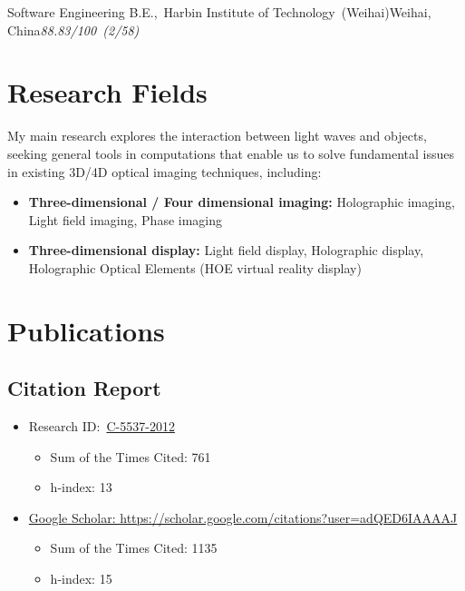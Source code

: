 \documentclass[10pt,a4paper]{moderncv}
\begin{document}
{Software Engineering}
{B.E.,~Harbin Institute of Technology~(Weihai)}{Weihai, China}{\textit{88.83/100~(2/58)}}{}

\section{Research Fields}
My main research explores the interaction between light waves and objects, seeking general tools in computations that enable us to solve fundamental issues in existing 3D/4D optical imaging techniques, including:
\begin{itemize}
	\item \textbf{Three-dimensional / Four dimensional imaging:} Holographic imaging, Light field imaging, Phase imaging
	\item \textbf{Three-dimensional display:} Light field display, Holographic display, Holographic Optical Elements (HOE virtual reality display)
\end{itemize}

\section{Publications}

\subsection{Citation Report}

\begin{itemize}
	\item Research ID:~\href{http://www.researcherid.com/rid/C-5537-2012}{C-5537-2012}
	\begin{itemize}
		\item Sum of the Times Cited: 761
		\item h-index: 13
	\end{itemize}
	
	\vspace{3pt}
	\item \href{https://scholar.google.com/citations?user=adQED6IAAAAJ&sortby=pubdate}{Google Scholar: https://scholar.google.com/citations?user=adQED6IAAAAJ}
	\begin{itemize}
		\item Sum of the Times Cited: 1135
		\item h-index: 15
	\end{itemize}
\end{itemize}
\end{document}
